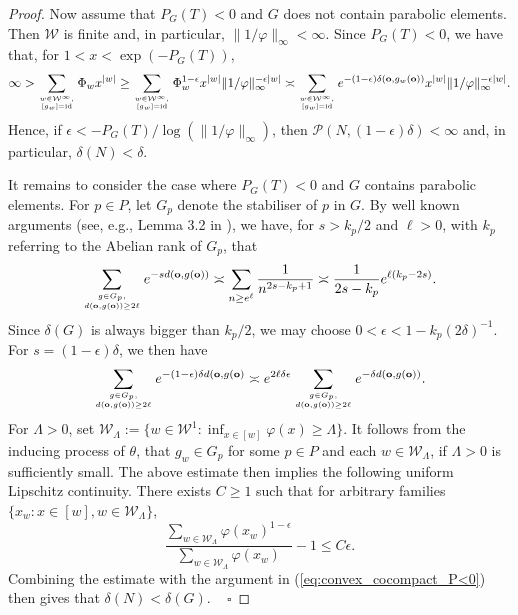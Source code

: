 \documentclass[10pt]{article}
\theoremstyle{mystyle}
\newcommand{\cW}{\mathcal{W}}
\newcommand{\cP}{\mathcal{P}}
\newcommand{\te}{{\theta}}
\newcommand{\1}{\mathbf{1}}
\newcommand{\with}{:}
\DeclareMathOperator{\id}{id}
\begin{document}
\begin{proof}
Now assume that $P_G(T)<0$ and $G$ does not contain parabolic elements. Then $\cW$ is finite and, in particular, $\|1/\varphi\|_\infty < \infty$. Since $P_G(T)<0$, we have that, for $1<x<\exp(-P_G(T))$,  
\begin{align}  \label{eq:convex_cocompact_P<0}
 \infty  > \sum_{\genfrac{}{}{0pt}{}{w \in \cW^\infty,}{ [g_w]=\id}} \Phi_w x^{|w|} \geq \sum_{\genfrac{}{}{0pt}{}{w \in \cW^\infty,}{ [g_w]=\id}}  \Phi_w^{1-\epsilon} {x^{|w|}}{\|1/\varphi\|_\infty^{-\epsilon|w|} }
  \asymp \sum_{\genfrac{}{}{0pt}{}{w \in \cW^\infty,}{ [g_w]=\id}}
 e^{- (1-\epsilon)\delta(\mathbf{o},g_w(\mathbf{o}))} {x^{|w|}}{\|1/\varphi\|_\infty^{-\epsilon|w|} }  . 
 \end{align} 
Hence, if $\epsilon 
< -P_G(T)/\log(\|1/\varphi\|_\infty)$, then $\cP(N,(1-\epsilon)\delta)< \infty$ and, in particular, $\delta(N)<\delta$.  

It remains to consider the case where $P_G(T)<0$ and $G$ contains parabolic elements. For $p \in P$, let $G_p$ denote the stabiliser of $p$ in $G$. 
 By well known arguments (see, e.g., Lemma 3.2 in \cite{StratmannVelani:1995}), we have, for $s > k_p/2$ and $\ell >0$, with $k_p$ referring to the Abelian rank of $G_p$, that 
\[ 
\sum_{\genfrac{}{}{0pt}{}{g \in G_p, }{ d(\mathbf{o},g(\mathbf{o}))\geq 2 \ell}} e^{-sd(\mathbf{o},g(\mathbf{o}))} \asymp \sum_{n \geq e^\ell} \frac{1}{n^{2s - k_p+1}} \asymp \frac{1}{2s - k_p} e^{\ell (k_p-2s)}. 
\]
Since $\delta(G)$ is always bigger than $k_p/2$, we may choose $0<\epsilon< 1-k_p(2\delta)^{-1}$.  For $s=(1-\epsilon)\delta $, we then have
\[
 \sum_{\genfrac{}{}{0pt}{}{g \in G_p, }{ d(\mathbf{o},g(\mathbf{o}))\geq 2 \ell}} e^{-(1-\epsilon)\delta d(\mathbf{o},g(\mathbf{o})}
\asymp 
e^{2 \ell \delta\epsilon}
\sum_{\genfrac{}{}{0pt}{}{g \in G_p, }{ d(\mathbf{o},g(\mathbf{o}))\geq 2 \ell}} e^{-\delta d(\mathbf{o},g(\mathbf{o}))} .
 \]
For $\Lambda >0$, set $\cW_\Lambda := \{w \in \cW^1\with \inf_{x \in [w]} \varphi(x) \geq \Lambda\}$. 
It follows from the inducing process of $\te$, that $g_w \in G_p$ for some  $p \in P$ and each $w \in \cW_\Lambda$, if $\Lambda>0$ is sufficiently small. The above estimate then implies the following uniform Lipschitz continuity. There exists $C\geq 1$ such that for arbitrary families $\{x_w \with x  \in [w], w \in \cW_\Lambda\}$, 
\[
 \frac{\sum_{w\in \cW_\Lambda}\varphi(x_w)^{1-\epsilon} }{\sum_{w\in \cW_\Lambda}\varphi(x_w)}  - 1  \leq C\epsilon.
\]
Combining the estimate with the argument in (\ref{eq:convex_cocompact_P<0}) then gives that
 $\delta(N)<\delta(G)$.
~ \hfill $\square$ \end{proof}
\end{document}

